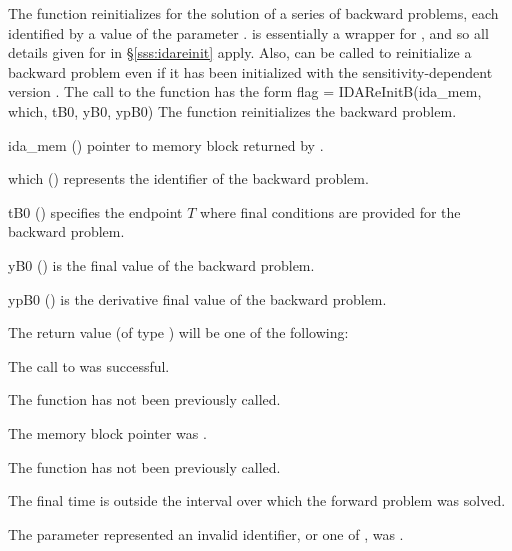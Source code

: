 The function  reinitializes {\idas} for the solution of a series
of backward problems, each identified by a value of the parameter .
 is essentially a wrapper for , and so all details
given for  in \S\ref{sss:idareinit} apply.
Also,  can be called to reinitialize a backward problem even if it
has been initialized with the sensitivity-dependent version .
The call to the  function has the form
{
  flag = IDAReInitB(ida\_mem, which, tB0, yB0, ypB0)
}
{
  The function  reinitializes {\idas} the backward problem.
}
{
  \begin{args}
  \item[ida\_mem] ()
    pointer to {\idas} memory block returned by .
  \item[which] ()
    represents the identifier of the backward problem.
  \item[tB0] ()
    specifies the endpoint $T$ where final conditions are provided for the 
    backward problem.
  \item[yB0] ()
    is the final value of the backward problem. 
  \item[ypB0] ()
    is the derivative final value of the backward problem. 
  \end{args}
}
{
  The return value  (of type ) will be one of the following:
  \begin{args}
  \item[\Id{IDA\_SUCCESS}]
    The call to  was successful.
  \item[\Id{IDA\_NO\_MALLOC}]
    The function  has not been previously called.
  \item[\Id{IDA\_MEM\_NULL}] 
    The  memory block pointer was .
  \item[\Id{IDA\_NO\_ADJ}]
    The function  has not been previously called.
  \item[\Id{IDA\_BAD\_TB0}]
    The final time  is outside the interval over which the forward problem
    was solved.
  \item[\Id{IDA\_ILL\_INPUT}]
    The parameter  represented an invalid identifier, or one
    of ,  was .
  \end{args}
}
{}

